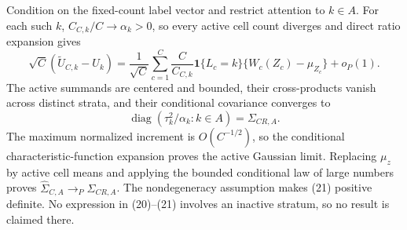 Condition on the fixed-count label vector and restrict attention to \(k\in A\).  For each such \(k\), \(C_{C,k}/C\to\alpha_k>0\), so every active cell count diverges and direct ratio expansion gives
\[
 \sqrt C(\widetilde U_{C,k}-U_k)
 =\frac1{\sqrt C}\sum_{c=1}^C\frac{C}{C_{C,k}}\mathbf1\{L_c=k\}
 \{W_c(Z_c)-\mu_{Z_c}\}+o_P(1). \tag{20}
\]
The active summands are centered and bounded, their cross-products vanish across distinct strata, and their conditional covariance converges to
\[
 \operatorname{diag}(\tau_k^2/\alpha_k:k\in A)=\Sigma_{CR,A}. \tag{21}
\]
The maximum normalized increment is \(O(C^{-1/2})\), so the conditional characteristic-function expansion proves the active Gaussian limit.  Replacing \(\mu_z\) by active cell means and applying the bounded conditional law of large numbers proves \(\widehat\Sigma_{C,A}\to_P\Sigma_{CR,A}\).  The nondegeneracy assumption makes (21) positive definite.  No expression in (20)--(21) involves an inactive stratum, so no result is claimed there.